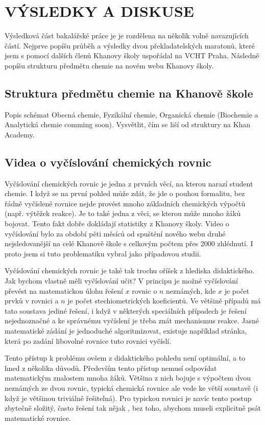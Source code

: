 \documentclass[a4paper, 12pt]{article}
\begin{document}
\newpage
\section{VÝSLEDKY A DISKUSE}
Výsledková část bakalářské práce je je rozdělena na několik volně navazujících částí.
Nejprve popíšu průběh a výsledky dvou překladatelských maratonů, které jsem s pomocí dalších členů Khanovy školy uspořádal na VCHT Praha. Následně popíšu strukturu předmětu chemie na novém webu Khanovy školy. 


\subsection{Struktura předmětu chemie na Khanově škole}
Popis schémat Obecná chemie, Fyzikální chemie, Organická chemie (Biochemie a Analytická chemie comming soon).
Vysvětlit, čím se liší od struktury na Khan Academy.

\subsection{Videa o vyčíslování chemických rovnic}
Vyčíslování chemických rovnic je jedna z prvních věcí, na kterou narazí student chemie. I když se na první pohled může zdát, že jde o pouhou formalitu, bez řádně vyčíslené rovnice nejde provést mnoho základních chemických výpočtů (např. výtěžek reakce). Je to také jedna z věci, se kterou může mnoho žáků bojovat. Tento fakt dobře dokládají statistiky z Khanovy školy. Video o vyčíslování bylo za období pěti měsíců od spuštění nového webu druhé nejsledovanější na celé Khanově škole s celkovým počtem přes 2000 zhlédnutí. I proto jsem si tuto problematiku vybral jako případovou studii. 

Vyčíslování chemických rovnic je také tak trochu oříšek z hlediska didaktického. Jak bychom vlastně měli vyčíslování učit?
V principu je možné vyčíslování převést na matematickou úlohu řešení $x$ rovnic o $n$ neznámých, kde $x$ je počet prvků v rovnici a $n$ je počet stechiometrických koeficientů.\cite{marecek} Ve většině případů má tato soustava jediné řešení, i když v některých speciálních případech je řešení nejednoznačné a ke správnému vyčíslení je třeba znát mechanismus reakce. Jasné matematické zádání je jednoduché algoritmizovat, existuje například stránka, která po zadání libovolné rovnice tuto rovnici vyčíslí.\cite{}

Tento přístup k problému ovšem z didaktického pohledu není optimální, a to hned z několika důvodů.
Především tento přístup nemusí odpovídat matematickým znalostem mnoha žáků. Většina z nich bojuje s výpočtem dvou neznámých ze dvou rovnic, typická chemická rovnice ale vede ke větší soustavě (i když je většinou triviálně řešitelná).
Pro typickou rovnici je navíc tento postup zbytečně složitý, často řešení tak nějak , bez toho, abychom museli explicitně psát matematické rovnice. 
\end{document}
